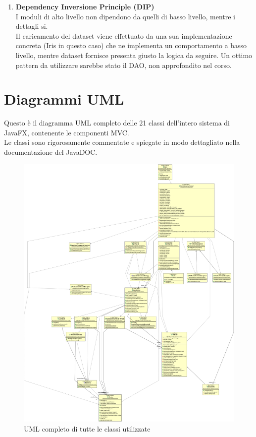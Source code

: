 \documentclass[a4paper, oneside]{book}
\begin{document}
\begin{enumerate}
        \item \textbf{Dependency Inversione Principle (DIP)}\\
        I moduli di alto livello non dipendono da quelli di basso livello, mentre i dettagli si.\\
        Il caricamento del dataset viene effettuato da una sua implementazione concreta (Iris in questo caso) che ne implementa un comportamento a basso livello, mentre dataset fornisce presenta giusto la logica da seguire. Un ottimo pattern da utilizzare sarebbe stato il DAO, non approfondito nel corso.
    \end{enumerate}

 \newpage
 \section*{Diagrammi UML}
Questo è il diagramma UML completo delle 21 classi dell'intero sistema di JavaFX, contenente le componenti MVC.
\\ Le classi sono rigorosamente commentate e spiegate in modo dettagliato nella documentazione del JavaDOC.\\

 \begin{figure}[htp]
\centering
\includegraphics[width=14cm]{umlCompleto.png}
\caption{UML completo di tutte le classi utilizzate}
\label{fig:uml completo}
\end{figure}
\end{document}
